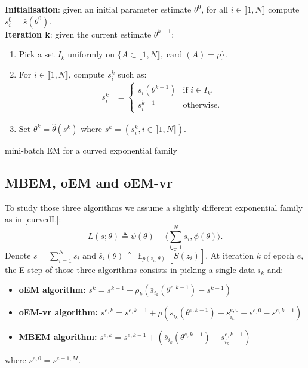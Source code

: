 \documentclass[11pt]{article}
\theoremstyle{plain}
\newcommand{\inter}{\llbracket1,N\rrbracket}
\DeclareMathOperator*{\E}{\mathbb{E}}
\theoremstyle{plain}
\theoremstyle{definition}
\begin{document}
\begin{algorithm}[H]
\textbf{Initialisation}: given an initial parameter estimate $\theta^0$, for all $i \in \inter$ compute $s^0_i = \bar{s}(\theta^0)$.\\
\textbf{Iteration k}: given the current estimate $\theta^{k-1}$:
\begin{enumerate}
\item Pick a set $I_k$ uniformly on $\{A \subset \inter, \operatorname{card}(A)=p\}$.
\item For $i \in \inter$, compute $s^k_{i}$ such as:
\begin{align}
 s^k_i &=
  \begin{cases}
   \bar{s}_i(\theta^{k-1})    & \text{if } i \in I_k.\\
   s^{k-1}_i                               & \text{otherwise}.
  \end{cases}
\end{align}

\item Set $\theta^{k} = \hat{\theta}(s^k)$ where $s^k = (s^k_i, i \in \inter)$.

\end{enumerate}
\caption{mini-batch EM for a curved exponential family}
\label{alg:mbem-expo}
\end{algorithm}

\subsection{MBEM, oEM and oEM-vr}
To study those three algorithms we assume a slightly different exponential family as in \eqref{curvedL}:
\begin{equation}\label{curvedL}
L(s;\theta) \triangleq \psi(\theta) - \langle \sum_{i=1}^N{s_i}, \phi(\theta)\rangle.
\end{equation}
Denote $s = \sum_{i=1}^N{s_i}$ and $\bar{s}_i(\theta) \triangleq \E_{p(z_i, \theta)}[\tilde{S}(z_i)]$. At iteration $k$ of epoch $e$, the E-step of those three algorithms consists in picking a single data $i_k$ and:
\begin{itemize}
\item \textbf{oEM algorithm:}  $s^{k} = s^{k-1} + \rho_k ( \bar{s}_{i_k}(\theta^{e,k-1})  - s^{k-1} )$
\item \textbf{oEM-vr algorithm: }  $s^{e,k} = s^{e,k-1} + \rho ( \bar{s}_{i_k}(\theta^{e,k-1}) - s_{i_k}^{e,0}+ s^{e,0} - s^{e,k-1} )$
\item \textbf{MBEM algorithm: }  $s^{e,k} = s^{e,k-1} +  ( \bar{s}_{i_k}(\theta^{e,k-1})  - s_{i_k}^{e,k-1} )$
\end{itemize}
where $ s^{e,0}  = s^{e-1,M}$.
\end{document}

